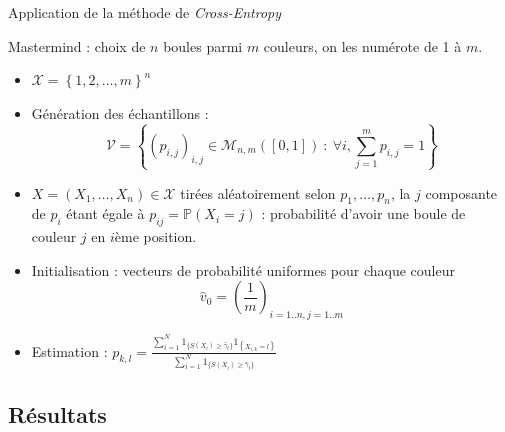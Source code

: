 \documentclass[10pt,xcolor=table,color={dvipsnames,usenames},ignorenonframetext,usepdftitle=false,french]{beamer}
\begin{document}
\begin{frame}{Application de la méthode de \emph{Cross-Entropy}}
\protect\hypertarget{application-de-la-muxe9thode-de-cross-entropy-1}{}

Mastermind : choix de \(n\) boules parmi \(m\) couleurs, on les numérote
de 1 à \(m\).

\begin{itemize}
\item $\mathcal{X}=\left\{ 1,2,\dots,m\right\}^{n}$  
\item Génération des échantillons : $$\mathcal{V} = \left\{ \left(p_{i,j}\right)_{i,j} \in\mathcal{M}_{n,m}([0,1])\::\:\forall i,\sum_{j=1}^mp_{i,j}=1\right\} $$
\item $X=(X_{1},\dots,X_{n})\in\mathcal{X}$ tirées aléatoirement selon $p_{1},\dots,p_{n}$, la $j$ \ieme composante de $p_{i}$ étant égale à $p_{ij}=\mathbb{P}(X_{i}=j)$ : probabilité d'avoir une boule de couleur $j$ en $i$ème position.
\item Initialisation : vecteurs de probabilité uniformes pour chaque couleur
$$
\hat{v}_{0}=\left(\frac{1}{m}\right)_{i=1..n,j=1..m}
$$
\item Estimation : $p_{k,l}=\frac{\sum_{i=1}^{N}1_{\{S(X_{i})\geq\hat{\gamma}_{t}\}}1_{\left\{ X_{i,k}=l\right\} }}{\sum_{i=1}^{N}1_{\{S(X_{i})\geq\hat{\gamma}_{t}\}}}$
\end{itemize}

\end{frame}

\hypertarget{ruxe9sultats}{%
\subsection{Résultats}\label{ruxe9sultats}}
\end{document}

